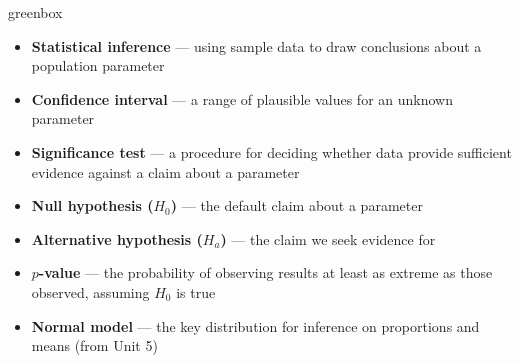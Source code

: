 \documentclass[10pt]{article}
\begin{document}
\begin{skillbox}{greenbox}
\begin{minipage}[t]{0.48\linewidth}
    \begin{itemize}
        \item \textbf{Statistical inference} --- using sample data to draw conclusions
              about a population parameter
        \item \textbf{Confidence interval} --- a range of plausible values for an
              unknown parameter
        \item \textbf{Significance test} --- a procedure for deciding whether data
              provide sufficient evidence against a claim about a parameter
    \end{itemize}
\end{minipage}
\hfill
\begin{minipage}[t]{0.48\linewidth}
    \begin{itemize}
        \item \textbf{Null hypothesis ($H_0$)} --- the default claim about a parameter
        \item \textbf{Alternative hypothesis ($H_a$)} --- the claim we seek evidence for
        \item \textbf{$p$-value} --- the probability of observing results at least as
              extreme as those observed, assuming $H_0$ is true
        \item \textbf{Normal model} --- the key distribution for inference on proportions
              and means (from Unit 5)
    \end{itemize}
\end{minipage}
\end{skillbox}
\end{document}
